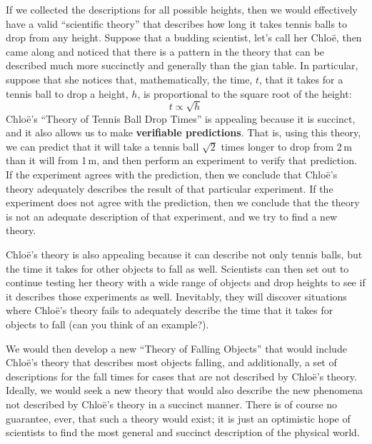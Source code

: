 If we collected the descriptions for all possible heights, then we would effectively have a valid ``scientific theory'' that describes how long it takes tennis balls to drop from any height. Suppose that a budding scientist, let's call her Chlo\"e, then came along and noticed that there is a pattern in the theory that can be described much more succinctly and generally than the gian table. In particular, suppose that she notices that, mathematically, the time, $t$, that it takes for a tennis ball to drop a height, $h$, is proportional to the square root of the height:
\begin{equation*}
t \propto \sqrt{h}
\end{equation*}
Chlo\"e's ``Theory of Tennis Ball Drop Times'' is appealing because it is succinct, and it also allows us to make \textbf{verifiable predictions}. That is, using this theory, we can predict that it will take a tennis ball $\sqrt 2$ times longer to drop from 2\,m than it will from 1\,m, and then perform an experiment to verify that prediction. If the experiment agrees with the prediction, then we conclude that Chlo\"e's theory adequately describes the result of that particular experiment. If the experiment does not agree with the prediction, then we conclude that the theory is not an adequate description of that experiment, and we try to find a new theory.

Chlo\"e's theory is also appealing because it can describe not only tennis balls, but the time it takes for other objects to fall as well. Scientists can then set out to continue testing her theory with a wide range of objects and drop heights to see if it describes those experiments as well. Inevitably, they will discover situations where Chlo\"e's theory fails to adequately describe the time that it takes for objects to fall (can you think of an example?).

We would then develop a new ``Theory of Falling Objects'' that would include Chlo\"e's theory that describes most objects falling, and additionally, a set of descriptions for the fall times for cases that are not described by Chlo\"e's theory. Ideally, we would seek a new theory that would also describe the new phenomena not described by Chlo\"e's theory in a succinct manner. There is of course no guarantee, ever, that such a theory would exist; it is just an optimistic hope of scientists to find the most general and succinct description of the physical world. 



 




